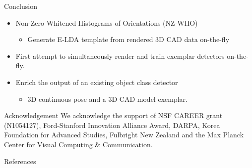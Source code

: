 \documentclass[serif,mathserif,final]{beamer}
\newcommand{\1}{\mathbb{I}} %
\begin{document}
\begin{frame}{}
\begin{columns}[t]
\begin{column}{0.23\linewidth}
      \begin{block}{Conclusion}
        \begin{itemize}
          \item Non-Zero Whitened Histograms of Orientations (NZ-WHO)
            \begin{itemize}
              \item Generate E-LDA template from rendered 3D CAD data {\color{red} on-the-fly}
            \end{itemize}
          \item First attempt to simultaneously render and train exemplar detectors on-the-fly.
          \item Enrich the output of an existing object class detector
            \begin{itemize}
              \item 3D continuous pose and a 3D CAD model exemplar.
            \end{itemize}
        \end{itemize}
      \end{block}

      \begin{block}{Acknowledgement}
        \small
        We acknowledge the support of NSF CAREER grant (N1054127),
        Ford-Stanford Innovation Alliance Award, DARPA, Korea Foundation for
        Advanced Studies, Fulbright New Zealand and the Max Planck Center for
        Visual Computing \& Communication.
      \end{block}

      \begin{block}{References}
        {\footnotesize
        
        
        }
      \end{block}
    \end{column}%
    
  \end{columns}
\end{frame}
\end{document}
